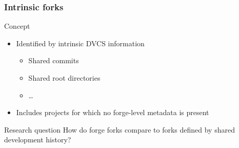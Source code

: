 \documentclass[aspectratio=169,xcolor=table]{beamer}
\begin{document}
    \begin{frame}
        \frametitle{Intrinsic forks}
        \begin{block}{Concept}
            \begin{center}
            \end{center}

            \begin{itemize}
                \item Identified by intrinsic DVCS information
                    \begin{itemize}
                        \item Shared commits
                        \item Shared root directories
                        \item \ldots
                    \end{itemize}
                \item Includes projects for which no forge-level metadata is present
            \end{itemize}
        \end{block}

        \begin{block}{Research question}
            How do forge forks compare to forks defined by shared development
            history?
        \end{block}
    \end{frame}
\end{document}
